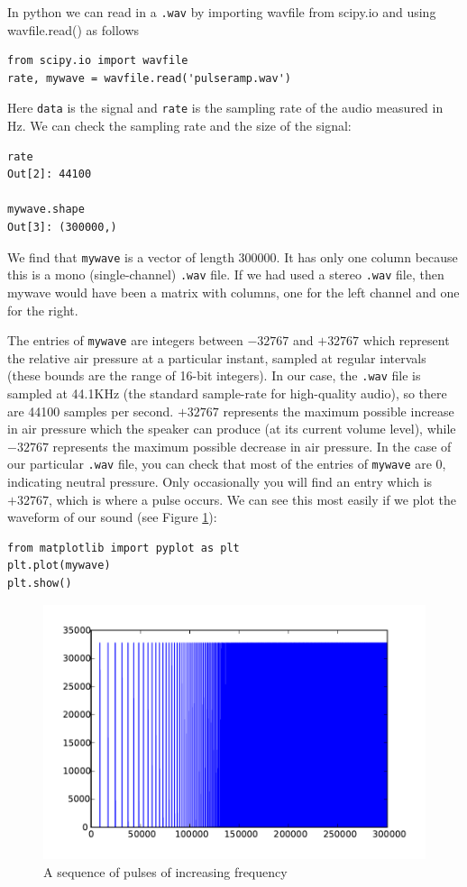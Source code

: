 In python we can read in a \texttt{.wav} by importing wavfile from scipy.io and using wavfile.read() as follows
\begin{lstlisting}
from scipy.io import wavfile
rate, mywave = wavfile.read('pulseramp.wav')
\end{lstlisting}
Here \texttt{data} is the signal and \texttt{rate} is the sampling rate of the audio measured in Hz.  We can check the sampling rate and the size of the signal:
\begin{lstlisting}
rate
Out[2]: 44100

mywave.shape
Out[3]: (300000,)
\end{lstlisting}
We find that \texttt{mywave} is a vector of length $300000$. It has only one column because this is a mono (single-channel) \texttt{.wav} file. If we had used a stereo \texttt{.wav} file, then mywave would have been a matrix with columns, one for the left channel and one for the right.

The entries of \texttt{mywave} are integers between $-32767$ and $+32767$ which represent the relative air pressure at a particular instant, sampled at regular intervals (these bounds are the range of 16-bit integers).   In our case, the \texttt{.wav} file is sampled at 44.1KHz (the standard sample-rate for high-quality audio), so there are 44100 samples per second. $+32767$ represents the maximum possible increase in air pressure which the speaker can produce (at its current volume level), while $-32767$ represents the maximum possible decrease in air pressure. In the case of our particular \texttt{.wav} file, you can check that most of the entries of \texttt{mywave} are $0$, indicating neutral pressure. Only occasionally you will find an entry which is $+32767$, which is where a pulse occurs.
We can see this most easily if we plot the waveform of our sound (see Figure \ref{pulseramp}):
\begin{lstlisting}
from matplotlib import pyplot as plt
plt.plot(mywave)
plt.show()
\end{lstlisting}
\begin{figure}[ht]\caption{A sequence of pulses of increasing frequency}\label{pulseramp}\centering\includegraphics[width=\textwidth]{pulseramp}\end{figure}

